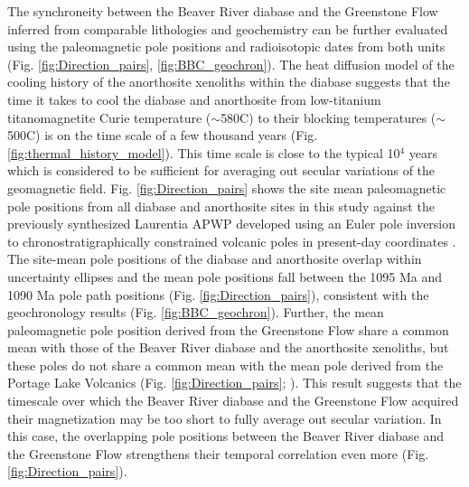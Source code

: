 The synchroneity between the Beaver River diabase and the Greenstone Flow inferred from comparable lithologies and geochemistry can be further evaluated using the paleomagnetic pole positions and radioisotopic dates from both units (Fig. \ref{fig:Direction_pairs}, \ref{fig:BBC_geochron}). The heat diffusion model of the cooling history of the anorthosite xenoliths within the diabase suggests that the time it takes to cool the diabase and anorthosite from low-titanium titanomagnetite Curie temperature ($\sim$580\textdegree C) to their blocking temperatures ($\sim$500\textdegree C) is on the time scale of a few thousand years (Fig. \ref{fig:thermal_history_model}). This time scale is close to the typical 10$^4$ years which is considered to be sufficient for averaging out secular variations of the geomagnetic field. Fig. \ref{fig:Direction_pairs} shows the site mean paleomagnetic pole positions from all diabase and anorthosite sites in this study against the previously synthesized Laurentia APWP developed using an Euler pole inversion to chronostratigraphically constrained volcanic poles in present-day coordinates \citep{Swanson-Hysell2019a}. The site-mean pole positions of the diabase and anorthosite overlap within uncertainty ellipses and the mean pole positions fall between the 1095 Ma and 1090 Ma pole path positions (Fig. \ref{fig:Direction_pairs}), consistent with the geochronology results (Fig. \ref{fig:BBC_geochron}). Further, the mean paleomagnetic pole position derived from the Greenstone Flow share a common mean with those of the Beaver River diabase and the anorthosite xenoliths, but these poles do not share a common mean with the mean pole derived from the Portage Lake Volcanics (Fig. \ref{fig:Direction_pairs}; \cite{Swanson-Hysell2019a}). This result suggests that the timescale over which the Beaver River diabase and the Greenstone Flow acquired their magnetization may be too short to fully average out secular variation. In this case, the overlapping pole positions between the Beaver River diabase and the Greenstone Flow strengthens their temporal correlation even more (Fig. \ref{fig:Direction_pairs}). 

